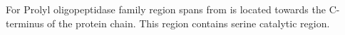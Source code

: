 For Prolyl oligopeptidase family region spans from is located towards the C-terminus of the protein chain. This region contains serine catalytic region.  